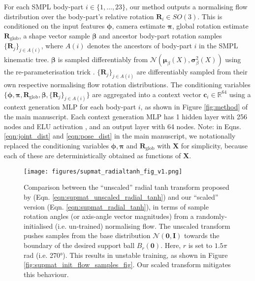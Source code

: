 For each SMPL body-part $i \in \{1, \ldots, 23\}$, our method outputs a normalising flow distribution over the body-part's relative rotation $\mathbf{R}_i \in SO(3)$. This is conditioned on the input features $\boldsymbol\phi$, camera estimate $\pmb{\pi}$, global rotation estimate $\mathbf{R}_\text{glob}$, a shape vector sample $\boldsymbol{\beta}$ and ancestor body-part rotation samples $\{\mathbf{R}_j\}_{j\in A(i)}$, where $A(i)$ denotes the ancestors of body-part $i$ in the SMPL kinematic tree. $\boldsymbol{\beta}$ is sampled differentiably from $\mathcal{N}(\boldsymbol{\mu}_\beta(X), \boldsymbol{\sigma}^2_\beta(X))$ using the re-parameterisation trick \cite{kingma2014autoencoding}. $\{\mathbf{R}_j\}_{j\in A(i)}$ are differentiably sampled from their own respective normalising flow rotation distributions. The conditioning variables $\{\boldsymbol{\phi}, \pmb{\pi}, \mathbf{R}_\text{glob}, \boldsymbol{\beta}, \{\mathbf{R}_j\}_{j\in A(i)} \}$ are aggregated into a context vector $\mathbf{c}_i \in \mathbb{R}^{64}$ using a context generation MLP for each body-part $i$, as shown in Figure \ref{fig:method} of the main manuscript. Each context generation MLP has 1 hidden layer with 256 nodes and ELU activation \cite{clevert2016elu}, and an output layer with 64 nodes. Note: in Eqns. \ref{eqn:joint_dist} and \ref{eqn:pose_dist} in the main manuscript, we notationally replaced the conditioning variables $\boldsymbol{\phi}, \pmb{\pi}$ and $\mathbf{R}_\text{glob}$ with $\mathbf{X}$ for simplicity, because each of these are deterministically obtained as functions of $\mathbf{X}$.


\begin{figure}[t]
    \centering
    \texttt{[image: figures/supmat\_radialtanh\_fig\_v1.png]}
    \caption{Comparison between the ``unscaled'' radial tanh transform proposed by \cite{falorsi2019reparameterizing} (Eqn. \ref{eqn:supmat_unscaled_radial_tanh}) and our ``scaled'' version (Eqn. \ref{eqn:supmat_radial_tanh}), in terms of sample rotation angles (or axis-angle vector magnitudes) from a randomly-initialised (i.e. un-trained) normalising flow. The unscaled transform pushes samples from the base distribution $\mathcal{N}(\mathbf{0}, \mathbf{I})$ towards the boundary of the desired support ball $B_r(\mathbf{0})$. Here, $r$ is set to $1.5\pi$ rad (i.e. 270°). This results in unstable training, as shown in Figure \ref{fig:supmat_init_flow_samples_fig}. Our scaled transform mitigates this behaviour.}
    \vspace{-0.3cm}
    \label{fig:supmat_radialtanh_fig}
\end{figure}

